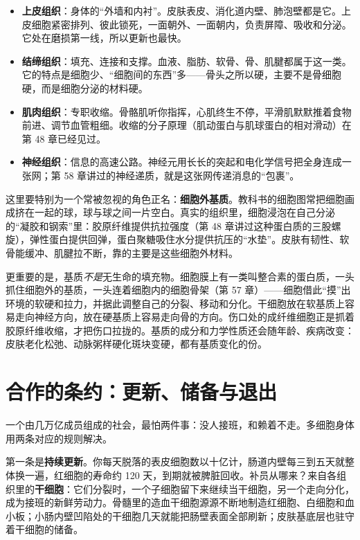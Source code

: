 \begin{itemize}[itemsep=2pt]
\item \textbf{上皮组织}：身体的“外墙和内衬”。皮肤表皮、消化道内壁、肺泡壁都是它。上皮细胞紧密排列、彼此锁死，一面朝外、一面朝内，负责屏障、吸收和分泌。它处在磨损第一线，所以更新也最快。
\item \textbf{结缔组织}：填充、连接和支撑。血液、脂肪、软骨、骨、肌腱都属于这一类。它的特点是细胞少、“细胞间的东西”多——骨头之所以硬，主要不是骨细胞硬，而是细胞分泌的材料硬。
\item \textbf{肌肉组织}：专职收缩。骨骼肌听你指挥，心肌终生不停，平滑肌默默推着食物前进、调节血管粗细。收缩的分子原理（肌动蛋白与肌球蛋白的相对滑动）在第 48 章已经见过。
\item \textbf{神经组织}：信息的高速公路。神经元用长长的突起和电化学信号把全身连成一张网；第 58 章讲过的神经递质，就是这张网传递消息的“包裹”。
\end{itemize}

这里要特别为一个常被忽视的角色正名：\textbf{细胞外基质}。教科书的细胞图常把细胞画成挤在一起的球，球与球之间一片空白。真实的组织里，细胞浸泡在自己分泌的“凝胶和钢索”里：胶原纤维提供抗拉强度（第 48 章讲过这种蛋白质的三股螺旋），弹性蛋白提供回弹，蛋白聚糖吸住水分提供抗压的“水垫”。皮肤有韧性、软骨能缓冲、肌腱拉不断，靠的主要是这些细胞外材料。

更重要的是，基质\emph{不是}无生命的填充物。细胞膜上有一类叫整合素的蛋白质，一头抓住细胞外的基质，一头连着细胞内的细胞骨架（第 57 章）——细胞借此“摸”出环境的软硬和拉力，并据此调整自己的分裂、移动和分化。干细胞放在软基质上容易走向神经方向，放在硬基质上容易走向骨的方向。伤口处的成纤维细胞正是抓着胶原纤维收缩，才把伤口拉拢的。基质的成分和力学性质还会随年龄、疾病改变：皮肤老化松弛、动脉粥样硬化斑块变硬，都有基质变化的份。

\section{合作的条约：更新、储备与退出}

一个由几万亿成员组成的社会，最怕两件事：没人接班，和赖着不走。多细胞身体用两条对应的规则解决。

第一条是\textbf{持续更新}。你每天脱落的表皮细胞数以十亿计，肠道内壁每三到五天就整体换一遍，红细胞的寿命约 120 天，到期就被脾脏回收。补员从哪来？来自各组织里的\textbf{干细胞}：它们分裂时，一个子细胞留下来继续当干细胞，另一个走向分化，成为接班的新鲜劳动力。骨髓里的造血干细胞源源不断地制造红细胞、白细胞和血小板；小肠内壁凹陷处的干细胞几天就能把肠壁表面全部刷新；皮肤基底层也驻守着干细胞的储备。

